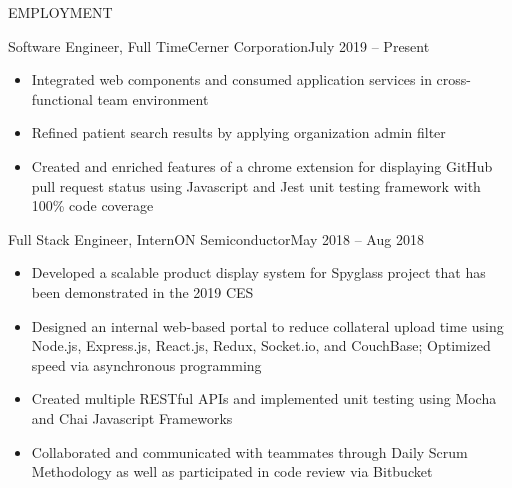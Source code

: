 \documentclass[]{mcdowellcv}
\begin{document}
	\makeheader
	
	\begin{cvsection}{EMPLOYMENT}
		\begin{cvsubsection}{Software Engineer, Full Time}{Cerner Corporation}{July 2019 -- Present}			
			\begin{itemize}
				\item Integrated web components and consumed application services in cross-functional team environment
				\item Refined patient search results by applying organization admin filter 
				\item Created and enriched features of a chrome extension for displaying GitHub pull request status using Javascript and Jest unit testing framework with 100\% code coverage
			\end{itemize}
		\end{cvsubsection}
		
		\begin{cvsubsection}{Full Stack Engineer, Intern}{ON Semiconductor}{May 2018 -- Aug 2018}	
			\begin{itemize}
				\item Developed a scalable product display system for Spyglass project that has been demonstrated in the 2019 CES
				\item Designed an internal web-based portal to reduce collateral upload time using Node.js, Express.js, React.js, Redux, Socket.io, and CouchBase; Optimized speed via asynchronous programming
				\item Created multiple RESTful APIs and implemented unit testing using Mocha and Chai Javascript Frameworks
				\item Collaborated and communicated with teammates through Daily Scrum Methodology as well as participated in code review via Bitbucket
			\end{itemize}
		\end{cvsubsection}
		

\end{cvsection}
\end{document}
